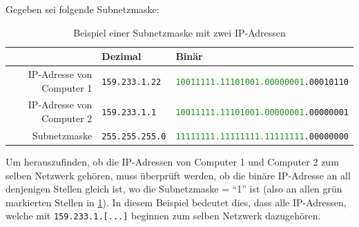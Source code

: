 \begin{myexample}[Subnetzmasken]\label{example:subnet}
Gegeben sei folgende Subnetzmaske:
\begin{table}[H]
	\centering
	\begin{tabular}{r|l|l}
		                                     & Dezimal                & Binär                                                                 \\\midrule\midrule
		\acrshort{IP}-Adresse von Computer 1 & \texttt{159.233.1.22}  & \texttt{\textcolor{ForestGreen}{10011111.11101001.00000001}.00010110} \\\midrule
		\acrshort{IP}-Adresse von Computer 2 & \texttt{159.233.1.1}   & \texttt{\textcolor{ForestGreen}{10011111.11101001.00000001}.00000001} \\\midrule
		Subnetzmaske                         & \texttt{255.255.255.0} & \texttt{\textcolor{ForestGreen}{11111111.11111111.11111111}.00000000}
	\end{tabular}
	\caption{Beispiel einer Subnetzmaske mit zwei IP-Adressen}
	\label{table:ex-subnet}
\end{table}
Um herauszufinden, ob die IP-Adressen von Computer 1 und Computer 2 zum selben Netzwerk gehören, muss überprüft werden, ob die binäre IP-Adresse an all denjenigen Stellen gleich ist, wo die Subnetzmaske = \enquote{1} ist (also an allen grün markierten Stellen in \cref{table:ex-subnet}). In diesem Beispiel bedeutet dies, dass alle \gls{IP}-Adressen, welche mit \texttt{159.233.1.[...]} beginnen zum selben Netzwerk dazugehören.
\end{myexample}


